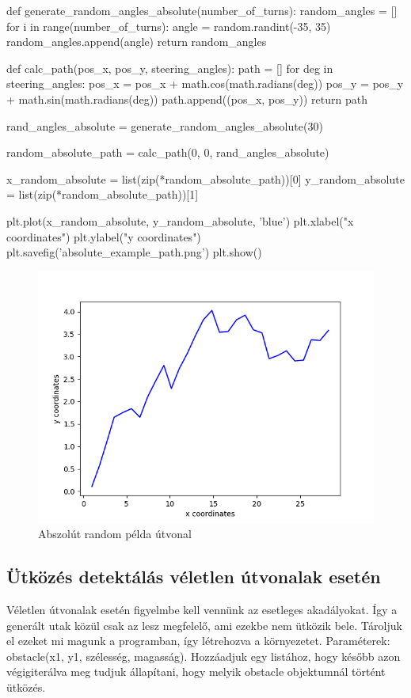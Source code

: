 \begin{python}
def generate_random_angles_absolute(number_of_turns):
    random_angles = []
    for i in range(number_of_turns):
        angle = random.randint(-35, 35)
        random_angles.append(angle)
    return random_angles
    
def calc_path(pos_x, pos_y, steering_angles):
    path = []
    for deg in steering_angles:
        pos_x = pos_x + math.cos(math.radians(deg))
        pos_y = pos_y + math.sin(math.radians(deg))
        path.append((pos_x, pos_y))
    return path
    
rand_angles_absolute = generate_random_angles_absolute(30)

random_absolute_path = calc_path(0, 0, rand_angles_absolute)

x_random_absolute = list(zip(*random_absolute_path))[0]
y_random_absolute = list(zip(*random_absolute_path))[1]

plt.plot(x_random_absolute, y_random_absolute, 'blue')
plt.xlabel("x coordinates")
plt.ylabel("y coordinates")
plt.savefig('absolute_example_path.png')
plt.show()
\end{python}

\begin{figure}[h!]
\centering
\includegraphics[scale=0.75]{images/absolute_example_path.png}
\caption{Abszolút random példa útvonal}
\label{fig:absolute_path}
\end{figure}

\newpage

\subsection{Ütközés detektálás véletlen útvonalak esetén}
Véletlen útvonalak esetén figyelmbe kell vennünk az esetleges akadályokat. Így a generált utak közül csak az lesz megfelelő, ami ezekbe nem ütközik bele. Tároljuk el ezeket mi magunk a programban, így létrehozva a környezetet. Paraméterek: obstacle(x1, y1, szélesség, magasság). Hozzáadjuk egy listához, hogy később azon végigiterálva meg tudjuk állapítani, hogy melyik obstacle objektumnál történt ütközés.

